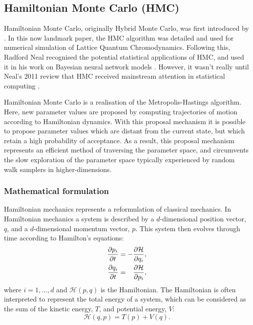 \subsection{Hamiltonian Monte Carlo (HMC)}

Hamiltonian Monte Carlo, originally Hybrid Monte Carlo, was first introduced by
\textcite{duane87}. In this now landmark paper, the HMC algorithm was detailed and used
for numerical simulation of Lattice Quantum Chromodynamics. Following this, Radford Neal
recognised the potential statistical applications of HMC, and used it in his work on
Bayesian neural network models \parencite{neal95}. However, it wasn't really until Neal's
2011 review \parencite{neal11} that HMC received mainstream attention in statistical
computing \parencite{betancourt18}.

Hamiltonian Monte Carlo is a realisation of the Metropolis-Hastings algorithm. Here,
new parameter values are proposed by computing trajectories of motion according to
Hamiltonian dynamics. With this proposal mechanism it is possible to propose parameter
values which are distant from the current state, but which retain a high probability of
acceptance. As a result, this proposal mechanism represents an efficient method of
traversing the parameter space, and circumvents the slow exploration of the parameter
space typically experienced by random walk samplers in higher-dimensions.

\subsubsection{Mathematical formulation}

Hamiltonian mechanics represents a reformulation of classical mechanics. In Hamiltonian
mechanics a  system is described by a $d$-dimensional position vector, $q$, and a
$d$-dimensional momentum vector, $p$. This system then evolves through time according to
Hamilton's equations:
\begin{align}
  \begin{split}
    \pdv{p_i}{t} &= - \pdv{\mathcal{H}}{q_i},\\
    \pdv{q_i}{t} &= \hphantom{-} \pdv{\mathcal{H}}{p_i},
  \end{split}
\end{align}
where $i=1,\ldots,d$ and $\mathcal{H}(p, q)$ is the Hamiltonian. The Hamiltonian is often
interpreted to represent the total energy of a system, which can be considered as the sum
of the kinetic energy, $T$, and potential energy, $V$:
\begin{equation}
  \label{eq:hamiltonian_decomp}
  \mathcal{H}(q, p) = T(p) + V(q).
\end{equation}

